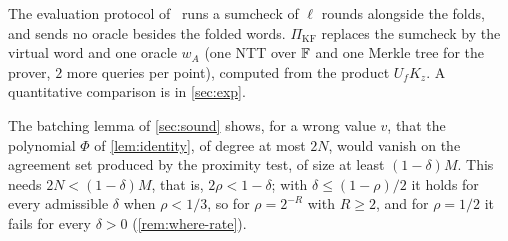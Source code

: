 \begin{remark}\label{rem:vs-kbfold}
The evaluation protocol of~\cite{Mkh26} runs a sumcheck of $\ell$ rounds alongside the folds, and sends no oracle besides the folded words.
$\Pi_{\mathrm{KF}}$ replaces the sumcheck by the virtual word and one oracle $w_A$ (one NTT over $\mathbb{F}$ and one Merkle tree for the prover, $2$ more queries per point), computed from the product $U_f K_z$.
A quantitative comparison is in \cref{sec:exp}.
\end{remark}

\begin{remark}[Why $R \ge 2$]\label{rem:rate}
The batching lemma of \cref{sec:sound} shows, for a wrong value $v$, that the polynomial $\Phi$ of \cref{lem:identity}, of degree at most $2N$, would vanish on the agreement set produced by the proximity test, of size at least $(1-\delta)M$.
This needs $2N < (1-\delta)M$, that is, $2\rho < 1-\delta$; with $\delta \le (1-\rho)/2$ it holds for every admissible $\delta$ when $\rho < 1/3$, so for $\rho = 2^{-R}$ with $R \ge 2$, and for $\rho = 1/2$ it fails for every $\delta > 0$ (\cref{rem:where-rate}).
\end{remark}
